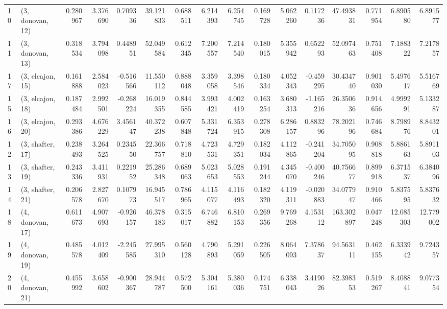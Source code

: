 \begin{tabular}{llrrrrrrrrrrrrrr}
10 &  (3, donovan, 12) &   0.280967 &  3.376690 &  0.709336 &   39.121833 &  0.688511 &   6.214393 &   6.254745 &  0.169728 &  5.062260 &  0.117236 &   47.493831 &  0.771954 &   6.890580 &   6.891577 \\
11 &  (3, donovan, 13) &   0.318534 &  3.794098 &  0.448951 &   52.049584 &  0.612345 &   7.200557 &   7.214540 &  0.180015 &  5.355942 &  0.652293 &   52.097463 &  0.751408 &   7.188322 &   7.217857 \\
17 &  (3, elcajon, 15) &   0.161888 &  2.584023 & -0.516566 &   11.550112 &  0.888048 &   3.359058 &   3.398546 &  0.180334 &  4.052343 & -0.459295 &   30.434740 &  0.901030 &   5.497617 &   5.516769 \\
15 &  (3, elcajon, 18) &   0.187484 &  2.992501 & -0.268224 &   16.019355 &  0.844585 &   3.993421 &   4.002419 &  0.163254 &  3.680313 & -1.165216 &   26.350636 &  0.914656 &   4.999291 &   5.133287 \\
16 &  (3, elcajon, 20) &   0.293386 &  4.676229 &  3.456147 &   40.372238 &  0.607848 &   5.331724 &   6.353915 &  0.278308 &  6.286157 &  0.883296 &   78.202196 &  0.746684 &   8.798976 &   8.843201 \\
12 &  (3, shafter, 17) &   0.238493 &  3.264525 &  0.234550 &   22.366757 &  0.718810 &   4.723531 &   4.729351 &  0.182034 &  4.112865 & -0.241204 &   34.705095 &  0.908818 &   5.886163 &   5.891103 \\
13 &  (3, shafter, 19) &   0.243336 &  3.411931 &  0.221952 &   25.286348 &  0.689063 &   5.023653 &   5.028553 &  0.191244 &  4.345070 & -0.400246 &   40.756677 &  0.899918 &   6.371537 &   6.384096 \\
14 &  (3, shafter, 21) &   0.206578 &  2.827670 &  0.107973 &   16.945517 &  0.786965 &   4.115077 &   4.116493 &  0.182320 &  4.119311 & -0.020883 &   34.077947 &  0.910466 &   5.837595 &   5.837632 \\
18 &  (4, donovan, 17) &   0.611673 &  4.907693 & -0.926157 &   46.378183 &  0.315017 &   6.746882 &   6.810153 &  0.269356 &  9.769268 &  4.153112 &  163.302897 &  0.047248 &  12.085303 &  12.779002 \\
19 &  (4, donovan, 19) &   0.485578 &  4.012409 & -2.245585 &   27.995310 &  0.560128 &   4.790893 &   5.291059 &  0.226505 &  8.064093 &  7.378637 &   94.563111 &  0.462155 &   6.333942 &   9.724357 \\
20 &  (4, donovan, 21) &   0.455992 &  3.658602 & -0.900367 &   28.944787 &  0.572500 &   5.304161 &   5.380036 &  0.174751 &  6.338043 &  3.419026 &   82.398353 &  0.519267 &   8.408841 &   9.077354 \\

\end{tabular}
